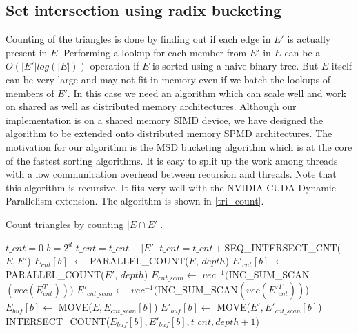 \documentclass[conference]{IEEEtran}
\begin{document}


\subsection{Set intersection using radix bucketing}
Counting of the triangles is done by finding out if each edge in $E'$ is actually present in $E$. Performing a lookup for each member from $E'$ in $E$ can be a $O(|E'|log(|E|))$ operation if $E$ is sorted using a naive binary tree. But $E$ itself can be very large and may not fit in memory even if we batch the lookups of members of $E'$. In this case we need an algorithm which can scale well and work on shared as well as distributed memory architectures. Although our implementation is on a shared memory SIMD device, we have designed the algorithm to be extended onto distributed memory SPMD architectures. The motivation for our algorithm is the MSD bucketing algorithm which is at the core of the fastest sorting algorithms\cite{b14}. It is easy to split up the work among threads with a low communication overhead between recursion and threads. Note that this algorithm is recursive. It fits very well with the NVIDIA CUDA Dynamic Parallelism extension\cite{b21}. The algorithm is shown in \ref{tri_count}.

\begin{algorithm}
  \caption{Count triangles by counting $|E \cap E'|$.\label{tri_count}}
  \begin{algorithmic}[1]
    \Statex
    \State $t\_cnt = 0$ 
    \State $b=2^d$ 
       \label{recursion_term_empty}
	\State \Return{}
      \EndIf
	\State $t\_cnt = t\_cnt + |E'|$
	\State \Return{}
      \EndIf
	\State $t\_cnt = t\_cnt +$SEQ\_INTERSECT\_CNT($E, E'$)
	\State \Return{}
      \EndIf
      \State $E_{cnt}[b]$ $\gets$ PARALLEL\_COUNT($E$, $depth$) \label{par_cnt_e}
      \State $E'_{cnt}[b]$ $\gets$ PARALLEL\_COUNT($E'$, $depth$) \label{par_cnt_e_prime}
      \State $E_{cnt\_scan} \gets$ $vec^{-1}($INC\_SUM\_SCAN$(vec(E^T_{cnt})))$ \label{inc_sum_scan_e_cnt}
      \State $E'_{cnt\_scan} \gets$ $vec^{-1}$(INC\_SUM\_SCAN$(vec(E'^T_{cnt}))$) \label{inc_sum_scan_e_prime_cnt}
	\State $E_{buf}[b] \gets$ MOVE($E, E_{cnt\_scan}[b]$) \label{move_e_cnt_scan}
      \EndFor
	\State $E'_{buf}[b] \gets$ MOVE($E', E'_{cnt\_scan}[b]$) \label{move_e_prime_cnt_scan}
      \EndFor
	\State INTERSECT\_COUNT($E_{buf}[b], E'_{buf}[b], t\_cnt, depth+1$) \label{recursion_call}
      \EndFor
    \EndFunction
  \end{algorithmic}
\end{algorithm}
\end{document}
